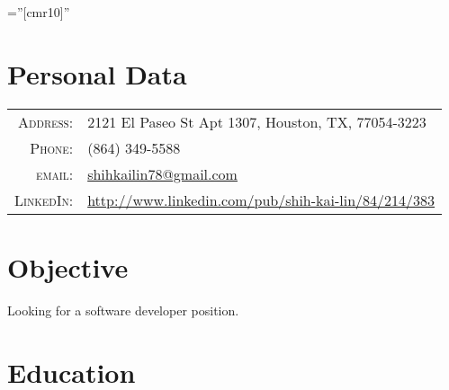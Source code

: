 \documentclass[11pt]{article} %
\begin{document}
\pagestyle{empty} %

\font\fb=''[cmr10]'' %


\par{\bigskip\par} %

\section{Personal Data}

\begin{tabular}{rl}
\textsc{Address:} & 2121 El Paseo St Apt 1307, Houston, TX, 77054-3223 \\
\textsc{Phone:} & (864) 349-5588 \\
\textsc{email:} & \href{mailto:shihkailin78@gmail.com}{shihkailin78@gmail.com} \\
\textsc{LinkedIn:} & \href{http://www.linkedin.com/pub/shih-kai-lin/84/214/383}{http://www.linkedin.com/pub/shih-kai-lin/84/214/383}
\end{tabular}


\section{Objective}
Looking for a software developer position.


\section{Education}
\end{document}
